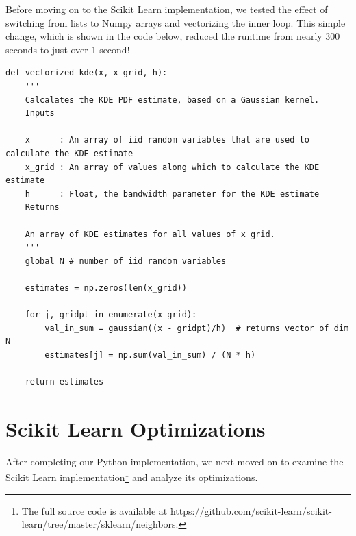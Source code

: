 \documentclass[11pt]{article}
\begin{document}
\noindent Before moving on to the Scikit Learn implementation, we tested the effect of switching from lists to Numpy arrays and vectorizing the inner loop. This simple change, which is shown in the code below, reduced the runtime from nearly 300 seconds to just over 1 second!

\begin{framed}
\begin{singlespacing}
\begin{scriptsize}
\begin{verbatim}
def vectorized_kde(x, x_grid, h):
    '''
    Calcalates the KDE PDF estimate, based on a Gaussian kernel.
    Inputs
    ----------
    x      : An array of iid random variables that are used to calculate the KDE estimate
    x_grid : An array of values along which to calculate the KDE estimate
    h      : Float, the bandwidth parameter for the KDE estimate
    Returns
    ----------
    An array of KDE estimates for all values of x_grid.
    '''    
    global N # number of iid random variables

    estimates = np.zeros(len(x_grid))
    
    for j, gridpt in enumerate(x_grid):
        val_in_sum = gaussian((x - gridpt)/h)  # returns vector of dim N
        estimates[j] = np.sum(val_in_sum) / (N * h)
    
    return estimates
\end{verbatim}
\end{scriptsize}
\end{singlespacing}
\end{framed}

\newpage

\section{Scikit Learn Optimizations}

After completing our Python implementation, we next moved on to examine the Scikit Learn implementation\footnote{The full source code is available at https://github.com/scikit-learn/scikit-learn/tree/master/sklearn/neighbors.} and analyze its optimizations.


\end{document}
